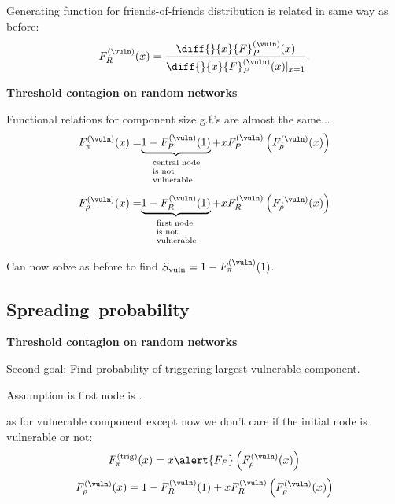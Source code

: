     Generating function for friends-of-friends distribution is
    related in same way as before:
    $$
    F_R^{(\vuln)}(x) 
    = 
    \frac{
      \diff{}{x}{F}_P^{(\vuln)}(x)}
    {\diff{}{x} {F}_P^{(\vuln)}(x)|_{x=1}}.
    $$
  


  \textbf{Threshold contagion on random networks}

  
   Functional relations for component size g.f.'s
    are almost the same...
    $$
    {
      {F}_{\pi}^{(\vuln)}(x)
      =
    }
    {
      \underbrace{
        1-{F}_P^{(\vuln)}(1)
      }_{
        \mbox{
          \scriptsize
          \begin{tabular}{l}
            central node \\
            is not \\
            vulnerable
          \end{tabular}
        }
      }
      +
    }
    {
      x {F}_{P}^{(\vuln)}
      \left(
        {F}_{\rho}^{(\vuln)} (x)
      \right)
    }
    $$
    $$
    {
      {F}_{\rho}^{(\vuln)}(x)
      =
    }
    {
      \underbrace{
        1-{F}_R^{(\vuln)}(1)
      }_{
        \mbox{
          \scriptsize
          \begin{tabular}{l}
            first node \\
            is not \\
            vulnerable
          \end{tabular}
        }
      }
      +
    }
    {
      x {F}_{R}^{(\vuln)}
      \left(
        {F}_{\rho}^{(\vuln)} (x)
      \right)
    }
    $$
  
    Can now solve as before to find $S_{\textnormal{vuln}} = 1 - F_\pi^{(\vuln)}(1)$.
  



\subsection{Spreading\ probability}

  \textbf{Threshold contagion on random networks}

  
   \alert{Second goal:}
    Find probability of triggering largest vulnerable 
    component.
   
    Assumption is \alert{first node} is .
  
     as for vulnerable component except
    now we don't care if the initial node is vulnerable or not:
    $$
    {F}_{\pi}^{(\textnormal{trig)}}(x)
    =
    x \alert{{F}_{P}}
    \left(
      {F}_{\rho}^{(\vuln)} (x)
    \right)
    $$
    $$
    {F}_{\rho}^{(\vuln)}(x)
    =
    1-{F}_R^{(\vuln)}(1)
    +
    x {{F}_{R}^{(\vuln)}}
    \left(
      {F}_{\rho}^{(\vuln)} (x)
    \right)
    $$
  
